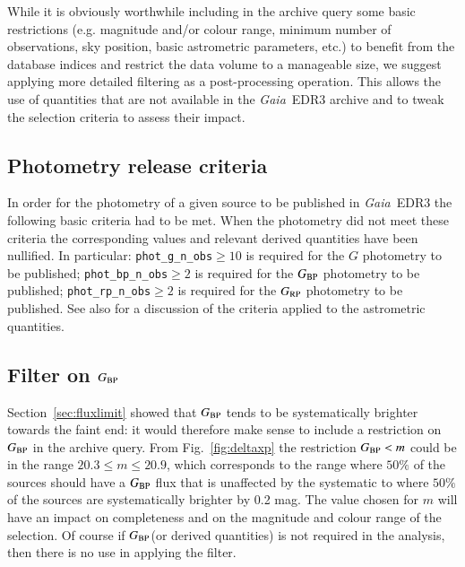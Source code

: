 \documentclass{aa}
\newcommand{\gaia}{\textit{Gaia}\xspace}
\newcommand{\gbp}{\ensuremath{G_{\rm BP}}\xspace}
\newcommand{\grp}{\ensuremath{G_{\rm RP}}\xspace}
\newcommand{\edr}{\gaia~EDR3\xspace}
\newcommand{\asecref}[1]{Section~\ref{sec:#1}}
\newcommand{\figref}[1]{Fig.~\ref{fig:#1}}
\begin{document}
While it is obviously worthwhile including in the archive query some basic restrictions (e.g. magnitude and/or colour range, minimum number of observations, sky position, basic astrometric parameters, etc.) to benefit from the database indices and restrict the data volume to a manageable size, we suggest applying more detailed filtering as a post-processing operation. This allows the use of quantities that are not available in the \edr archive and to tweak the selection criteria to assess their impact.

\subsection{Photometry release criteria}
In order for the photometry of a given source to be published in \edr the following basic criteria had to be met. When the photometry did not meet these criteria the corresponding values and relevant derived quantities have been nullified. In particular: \texttt{phot\_g\_n\_obs}$\geq10$ is required for the $G$ photometry to be published; \texttt{phot\_bp\_n\_obs}$\geq2$ is required for the \gbp photometry to be published; \texttt{phot\_rp\_n\_obs}$\geq2$ is required for the \grp photometry to be published.
See also \cite{DPACP-128} for a discussion of the criteria applied to the astrometric quantities.

\subsection{Filter on \gbp}\label{sec:filt_gbp}
\asecref{fluxlimit} showed that \gbp tends to be systematically brighter towards the faint end: it would therefore make sense to include a restriction on \gbp in the archive query. From \figref{deltaxp} the restriction $\gbp<m$ could be in the range $20.3\leq m\leq20.9$, which corresponds to the range where $50\%$ of the sources should have a \gbp flux that is unaffected by the systematic to where $50\%$ of the sources are systematically brighter by 0.2 mag. The value chosen for $m$ will have an impact on completeness and on the magnitude and colour range of the selection. Of course if \gbp (or derived quantities) is not required in the analysis, then there is no use in applying the filter. 
\end{document}
